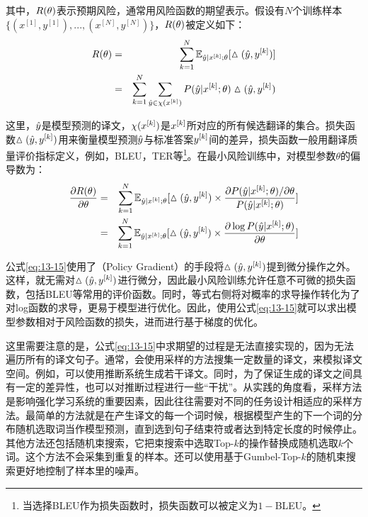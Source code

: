 \noindent 其中，${R}(\theta)$表示预期风险，通常用风险函数的期望表示。假设有$N$个训练样本$\{(x^{[1]},y^{[1]}),...,(x^{[N]},y^{[N]})\}$，${R}(\theta)$被定义如下：
\begin{eqnarray}
{R}(\theta) & = & \sum_{k=1}^N \mathbb{E}_{\hat{{y}}|{x}^{[k]};\theta}[\vartriangle(\hat{{y}},{y}^{[k]})] \nonumber \\
& = & \sum_{k=1}^N \sum_{\hat{{y}} \in \chi({x}^{[k]})}{P}(\hat{{y}}|{x}^{[k]};\theta)\vartriangle(\hat{{y}},{y}^{[k]})
\label{eq:13-14}
\end{eqnarray}

\noindent 这里，$\hat{{y}}$是模型预测的译文，$\chi({x}^{[k]})$是${x}^{[k]}$所对应的所有候选翻译的集合。损失函数$\vartriangle(\hat{{y}},{y}^{[k]})$用来衡量模型预测$\hat{{y}}$与标准答案${y}^{[k]}$间的差异，损失函数一般用翻译质量评价指标定义，例如，BLEU，TER等\footnote{当选择BLEU作为损失函数时，损失函数可以被定义为$1-$BLEU。}。在最小风险训练中，对模型参数$\theta$的偏导数为：
\begin{eqnarray}
\frac{\partial {R}(\theta)}{\partial \theta} & = & \sum_{k=1}^N \mathbb{E}_{\hat{{y}}|{x}^{[k]};\theta}[\vartriangle(\hat{{y}},{y}^{[k]}) \times \frac{\partial {P}(\hat{{y}}|{x}^{[k]};\theta)/\partial \theta}{{P}(\hat{{y}}|{x}^{[k]};\theta)}] \nonumber \\
& = & \sum_{k=1}^N \mathbb{E}_{\hat{{y}}|{x}^{[k]};\theta}[\vartriangle(\hat{{y}},{y}^{[k]}) \times \frac{\partial \log{{P}(\hat{{y}}|{x}^{[k]};\theta)}}{\partial \theta}]
\label{eq:13-15}
\end{eqnarray}

\noindent 公式\eqref{eq:13-15}使用了{\small{}}（Policy Gradient）的手段将$\vartriangle(\hat{{y}},{y}^{[k]})$提到微分操作之外。这样，就无需对$\vartriangle(\hat{{y}},{y}^{[k]})$进行微分，因此最小风险训练允许任意不可微的损失函数，包括BLEU等常用的评价函数。同时，等式右侧将对概率的求导操作转化为了对log函数的求导，更易于模型进行优化。因此，使用公式\eqref{eq:13-15}就可以求出模型参数相对于风险函数的损失，进而进行基于梯度的优化。

\parinterval 这里需要注意的是，公式\eqref{eq:13-15}中求期望的过程是无法直接实现的，因为无法遍历所有的译文句子。通常，会使用采样的方法搜集一定数量的译文，来模拟译文空间。例如，可以使用推断系统生成若干译文。同时，为了保证生成的译文之间具有一定的差异性，也可以对推断过程进行一些“干扰”。从实践的角度看，采样方法是影响强化学习系统的重要因素，因此往往需要对不同的任务设计相适应的采样方法。最简单的方法就是在产生译文的每一个词时候，根据模型产生的下一个词的分布随机选取词当作模型预测，直到选到句子结束符或者达到特定长度的时候停止。其他方法还包括随机束搜索，它把束搜索中选取Top-$k$的操作替换成随机选取$k$个词。这个方法不会采集到重复的样本。还可以使用基于Gumbel-Top-$k$的随机束搜索更好地控制了样本里的噪声。

